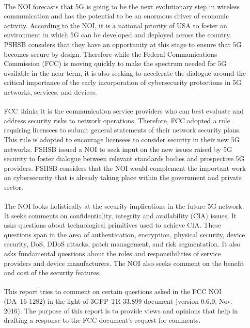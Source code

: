 \documentclass[12pt]{llncs}
\begin{document}
\paragraph{}
The NOI forecasts that 5G is going to be the next evolutionary step in wireless communication and has the potential to be an enormous driver of economic activity. According to the NOI, it is a national priority of USA to foster an environment in which 5G can be developed and deployed across the country. PSHSB considers that they have an opportunity at this stage to ensure that 5G becomes secure by design. Therefore while the Federal Communications Commission (FCC) is moving quickly to make the spectrum needed for 5G available in the near term, it is also seeking to accelerate the dialogue around the critical importance of the early incorporation of cybersecurity protections in 5G networks, services, and devices.
\paragraph{}
FCC thinks it is the communication service providers who can best evaluate and address security risks to network operations. Therefore, FCC adopted a rule requiring licensees to submit general statements of their network security plans. This rule is adopted to encourage licensees to consider security in their new 5G networks. PSHSB issued a NOI to seek input on the new issues raised by 5G security to foster dialogue between relevant standards bodies and prospective 5G providers. PSHSB considers that the NOI would complement the important work on cybersecurity that is already taking place within the government and private sector.
\paragraph{}
The NOI looks holistically at the security implications in the future 5G network. It seeks comments on confidentiality, integrity and availability (CIA) issues. It asks questions about technological primitives used to achieve CIA. These questions span in the area of authentication, encryption, physical security, device security, DoS, DDoS attacks, patch management, and risk segmentation. It also asks fundamental questions about the roles and responsibilities of service providers and device manufacturers. The NOI also seeks comment on the benefit and cost of the security features.
\paragraph{}
This report tries to comment on certain questions asked in the FCC NOI (DA~16-1282) in the light of 3GPP TR 33.899 document (version 0.6.0, Nov. 2016). The purpose of this report is to provide views and opinions that help in drafting a response to the FCC document's request for comments.
\end{document}
